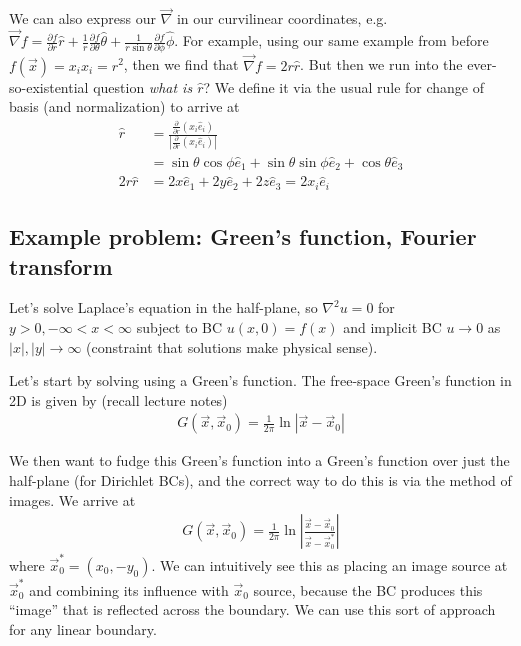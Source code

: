 \documentclass[12pt]{article}
\newcommand{\pd}[2]{\frac{\partial#1}{\partial#2}}
\newcommand{\abs}[1]{\left|#1\right|}
\begin{document}
We can also express our $\vec{\nabla}$ in our curvilinear coordinates, e.g. $\vec{\nabla}f = \pd{f}{r}\hat{r} + \frac{1}{r}\pd{f}{\theta}\hat{\theta} + \frac{1}{r\sin\theta}\pd{f}{\phi}\hat{\phi}$. For example, using our same example from before $f(\vec{x}) = x_ix_i = r^2$, then we find that $\vec{\nabla}f = 2r\hat{r}$. But then we run into the ever-so-existential question \emph{what is $\hat{r}$}? We define it via the usual rule for change of basis (and normalization) to arrive at
\begin{align}
    \hat{r} &= \frac{\pd{}{r}\left( x_i\hat{e}_i \right)}{\abs{\pd{}{r}\left( x_i\hat{e}_i \right)}} \\
    &= \sin\theta\cos\phi \hat{e}_1 + \sin\theta\sin\phi\hat{e}_2 + \cos\theta \hat{e}_3\\
    2r\hat{r} &= 2x\hat{e}_1 + 2y\hat{e}_2 + 2z\hat{e}_3 = 2x_i\hat{e}_i
\end{align}

\subsection{Example problem: Green's function, Fourier transform}

Let's solve Laplace's equation in the half-plane, so $\nabla^2 u = 0$ for $y > 0, -\infty < x < \infty$ subject to BC $u(x,0) = f(x)$ and implicit BC $u \to 0$ as $\abs{x}, \abs{y} \to \infty$ (constraint that solutions make physical sense).

Let's start by solving using a Green's function. The free-space Green's function in 2D is given by (recall lecture notes)
\begin{align}
    G(\vec{x}, \vec{x}_0) = \frac{1}{2\pi}\ln \abs{\vec{x} - \vec{x}_0}
\end{align}

We then want to fudge this Green's function into a Green's function over just the half-plane (for Dirichlet BCs), and the correct way to do this is via the method of images. We arrive at
\begin{align}
    G(\vec{x}, \vec{x}_0) = \frac{1}{2\pi}\ln \abs{\frac{\vec{x} - \vec{x}_0}{\vec{x} - \vec{x}^*_0}}
\end{align}
where $\vec{x}_0^* = (x_0, -y_0)$. We can intuitively see this as placing an image source at $\vec{x}_0^*$ and combining its influence with $\vec{x}_0$ source, because the BC produces this ``image'' that is reflected across the boundary. We can use this sort of approach for any linear boundary.
\end{document}
